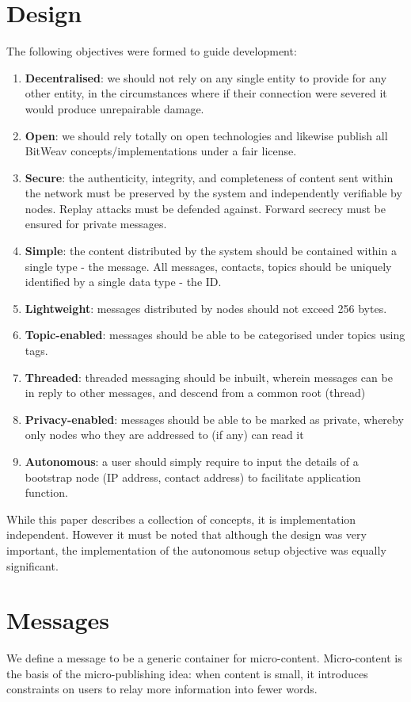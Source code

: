 \documentclass[10pt,a4paper,onecolumn]{article}
\begin{document}
\section{Design}
The following objectives were formed to guide development:
\begin{enumerate}
\item \textbf{Decentralised}: we should not rely on any single entity to provide for any other entity, in the circumstances where if their connection were severed it would produce unrepairable damage. 
\item \textbf{Open}: we should rely totally on open technologies and likewise publish all BitWeav concepts/implementations under a fair license.
\item \textbf{Secure}: the authenticity, integrity, and completeness of content sent within the network must be preserved by the system and independently verifiable by nodes. Replay attacks must be defended against. Forward secrecy must be ensured for private messages.
\item \textbf{Simple}: the content distributed by the system should be contained within a single type - the message. All messages, contacts, topics should be uniquely identified by a single data type - the ID.
\item \textbf{Lightweight}: messages distributed by nodes should not exceed 256 bytes. 
\item \textbf{Topic-enabled}: messages should be able to be categorised under topics using tags.
\item \textbf{Threaded}: threaded messaging should be inbuilt, wherein messages can be in reply to other messages, and descend from a common root (thread)
\item \textbf{Privacy-enabled}: messages should be able to be marked as private, whereby only nodes who they are addressed to (if any) can read it
\item \textbf{Autonomous}: a user should simply require to input the details of a bootstrap node (IP address, contact address) to facilitate application function.
\end{enumerate}

While this paper describes a collection of concepts, it is implementation independent. However it must be noted that although the design was very important, the implementation of the autonomous setup objective was equally significant.


\section{Messages}
We define a message to be a generic container for micro-content. Micro-content is the basis of the micro-publishing idea: when content is small, it introduces constraints on users to relay more information into fewer words.  
\end{document}
